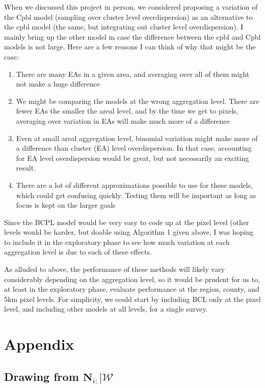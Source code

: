 \documentclass[12pt]{article}
\begin{document}
When we discussed this project in person, we considered proposing a variation of the Cpbl model (sampling over cluster level overdispersion) as an alternative to the cpbl model (the same, but integrating out cluster level overdispersion).  I mainly bring up the other model in case the difference between the cpbl and Cpbl models is not large.  Here are a few reasons I can think of why that might be the case:
\begin{enumerate}
\item There are many EAs in a given area, and averaging over all of them might not make a huge difference
\item We might be comparing the models at the wrong aggregation level. There are fewer EAs the smaller the areal level, and by the time we get to pixels, averaging over variation in EAs will make much more of a difference
\item Even at small areal aggregation level, binomial variation might make more of a difference than cluster (EA) level overdispersion. In that case, accounting for EA level overdispersion would be great, but not necessarily an exciting result.
\item There are a lot of different approximations possible to use for these models, which could get confusing quickly. Testing them will be important as long as focus is kept on the larger goals
\end{enumerate}
Since the BCPL model would be very easy to code up at the pixel level (other levels would be harder, but doable using Algorithm 1 given above, I was hoping to include it in the exploratory phase to see how much variation at each aggregation level is due to each of these effects.

As alluded to above, the performance of these methods will likely vary considerably depending on the aggregation level, so it would be prudent for us to, at least in the exploratory phase, evaluate performance at the region, county, and 5km pixel levels. For simplicity, we could start by including BCL only at the pixel level, and including other models at all levels, for a single survey.


\section{Appendix}

\subsection{Drawing from \texorpdfstring{$\boldsymbol{N}_{i:} \vert \mathscr{W}$}{N\textsubscript{i:} | W}}

%
%

%
\end{document}
